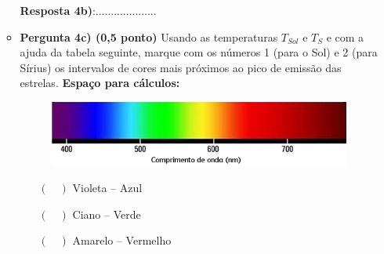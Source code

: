 \documentclass[a4paper, 12pt]{article}
\begin{document}
\begin{flushleft}
\begin{itemize}
\begin{itemize}
						\textbf{Resposta 4b)}:....................
					\item \textbf{Pergunta 4c) (0,5 ponto)} Usando as temperaturas $T_{Sol}$ e $T_S$ e com a ajuda da tabela seguinte, marque com os números 1 (para o Sol) e 2 (para Sírius) os intervalos de cores mais próximos ao pico de emissão das estrelas. \linebreak
						\textbf{Espaço para cálculos:} \linebreak \linebreak \linebreak \linebreak \linebreak \linebreak
						\begin{figure}[H]
							\centering
							\includegraphics[scale=0.5]{./img/4.png}
						\end{figure}
						\begin{multicols}{3} \begin{itemize}
							\item[$(\quad)$] Violeta -- Azul
							\item[$(\quad)$] Ciano -- Verde
							\item[$(\quad)$] Amarelo -- Vermelho
						\end{itemize} \end{multicols}
				\end{itemize}
				

\end{itemize}
\end{flushleft}
\end{document}

